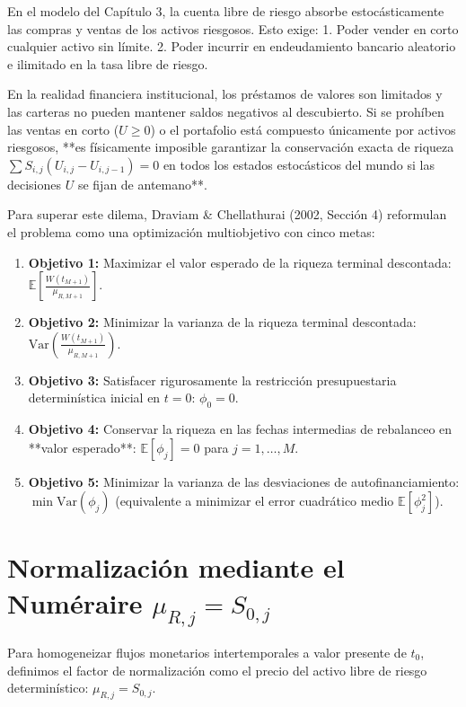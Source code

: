 \documentclass[11pt,a4paper]{report}
\numberwithin{equation}{chapter}
\begin{document}
En el modelo del Capítulo 3, la cuenta libre de riesgo absorbe estocásticamente las compras y ventas de los activos riesgosos. Esto exige:
1. Poder vender en corto cualquier activo sin límite.
2. Poder incurrir en endeudamiento bancario aleatorio e ilimitado en la tasa libre de riesgo.

En la realidad financiera institucional, los préstamos de valores son limitados y las carteras no pueden mantener saldos negativos al descubierto. Si se prohíben las ventas en corto ($U \ge 0$) o el portafolio está compuesto únicamente por activos riesgosos, **es físicamente imposible garantizar la conservación exacta de riqueza $\sum S_{i,j}(U_{i,j} - U_{i,j-1}) = 0$ en todos los estados estocásticos del mundo si las decisiones $U$ se fijan de antemano**.

Para superar este dilema, Draviam \& Chellathurai (2002, Sección 4) reformulan el problema como una optimización multiobjetivo con cinco metas:
\begin{enumerate}
    \item \textbf{Objetivo 1:} Maximizar el valor esperado de la riqueza terminal descontada: $\mathbb{E}\left[ \frac{W(t_{M+1})}{\mu_{R,M+1}} \right]$.
    \item \textbf{Objetivo 2:} Minimizar la varianza de la riqueza terminal descontada: $\mathrm{Var}\left( \frac{W(t_{M+1})}{\mu_{R,M+1}} \right)$.
    \item \textbf{Objetivo 3:} Satisfacer rigurosamente la restricción presupuestaria determinística inicial en $t=0$: $\phi_0 = 0$.
    \item \textbf{Objetivo 4:} Conservar la riqueza en las fechas intermedias de rebalanceo en **valor esperado**: $\mathbb{E}[\phi_j] = 0$ para $j=1,\dots,M$.
    \item \textbf{Objetivo 5:} Minimizar la varianza de las desviaciones de autofinanciamiento: $\min \mathrm{Var}(\phi_j)$ (equivalente a minimizar el error cuadrático medio $\mathbb{E}[\phi_j^2]$).
\end{enumerate}

\section{Normalización mediante el Numéraire $\mu_{R,j} = S_{0,j}$}

Para homogeneizar flujos monetarios intertemporales a valor presente de $t_0$, definimos el factor de normalización como el precio del activo libre de riesgo determinístico: $\mu_{R,j} = S_{0,j}$.
\end{document}

